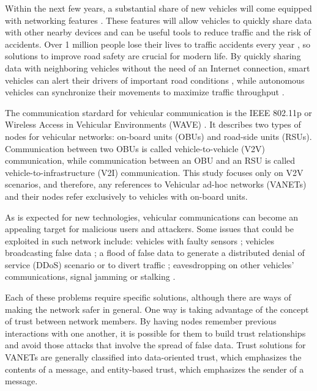 \documentclass[conference]{IEEEtran}
\begin{document}
Within the next few years, a substantial share of new vehicles will come equipped with networking features \cite{connectedcar2016}.
These features will allow vehicles to quickly share data with other nearby devices and can be useful tools to reduce traffic and the risk of accidents.
Over 1 million people lose their lives to traffic accidents every year \cite{whotraffic}, so solutions to improve road safety are crucial for modern life.
By quickly sharing data with neighboring vehicles without the need of an Internet connection, smart vehicles can alert their drivers of important road conditions \cite{barba2012smart}, while autonomous vehicles can synchronize their movements to maximize traffic throughput \cite{amoozadeh2015platoon}.

The communication stardard for vehicular communication is the IEEE 802.11p or Wireless Access in Vehicular Environments (WAVE) \cite{jiang2008ieee}.
It describes two types of nodes for vehicular networks: on-board units (OBUs) and road-side units (RSUs).
Communication between two OBUs is called vehicle-to-vehicle (V2V) communication, while communication between an OBU and an RSU is called vehicle-to-infrastructure (V2I) communication.
This study focuses only on V2V scenarios, and therefore, any references to Vehicular ad-hoc networks (VANETs) and their nodes refer exclusively to vehicles with on-board units.

As is expected for new technologies, vehicular communications can become an appealing target for malicious users and attackers.
Some issues that could be exploited in such network include: vehicles with faulty sensors \cite{isaac2010security}; vehicles broadcasting false data \cite{golle2004detecting}; a flood of false data to generate a distributed denial of service (DDoS) scenario or to divert traffic \cite{garip2015congestion}; eavesdropping on other vehicles' communications, signal jamming or stalking \cite{isaac2010security}. 

Each of these problems require specific solutions, although there are ways of making the network safer in general.
One way is taking advantage of the concept of trust between network members.
By having nodes remember previous interactions with one another, it is possible for them to build trust relationships and avoid those attacks that involve the spread of false data.
Trust solutions for VANETs are generally classified into data-oriented trust, which emphasizes the contents of a message, and entity-based trust, which emphasizes the sender of a message.
\end{document}
